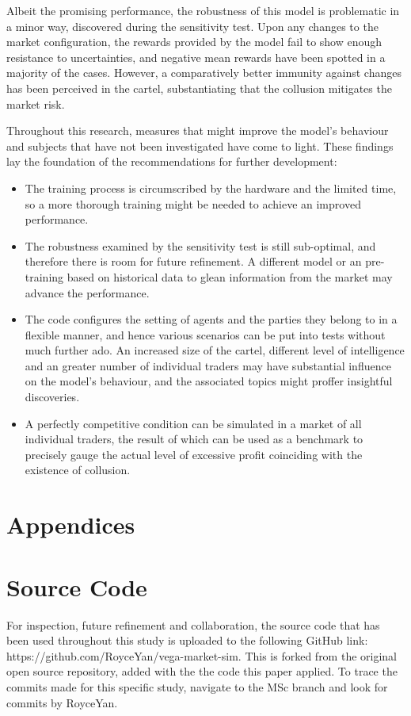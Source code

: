 \documentclass[11pt,twoside]{article}
\numberwithin{Theorem}{section}
\numberwithin{Definition}{section}
\numberwithin{Lemma}{section}
\numberwithin{Algorithm}{section}
\numberwithin{equation}{section}
\begin{document}
Albeit the promising performance, the robustness of this model is problematic in a minor way, discovered during the sensitivity test. Upon any changes to the market configuration, the rewards provided by the model fail to show enough resistance to uncertainties, and negative mean rewards have been spotted in a majority of the cases. However, a comparatively better immunity against changes has been perceived in the cartel, substantiating that the collusion mitigates the market risk.

Throughout this research, measures that might improve the model's behaviour and subjects that have not been investigated have come to light. These findings lay the foundation of the recommendations for further development:
\begin{itemize}
    \item The training process is circumscribed by the hardware and the limited time, so a more thorough training might be needed to achieve an improved performance.
    \item The robustness examined by the sensitivity test is still sub-optimal, and therefore there is room for future refinement. A different model or an pre-training based on historical data to glean information from the market may advance the performance.
    \item The code configures the setting of agents and the parties they belong to in a flexible manner, and hence various scenarios can be put into tests without much further ado. An increased size of the cartel, different level of intelligence and an greater number of individual traders may have substantial influence on the model's behaviour, and the associated topics might proffer insightful discoveries.
    \item A perfectly competitive condition can be simulated in a market of all individual traders, the result of which can be used as a benchmark to precisely gauge the actual level of excessive profit coinciding with the existence of collusion.
\end{itemize}



\clearpage


\clearpage

\appendix
\section*{Appendices}

\section{Source Code}
For inspection, future refinement and collaboration, the source code that has been used throughout this study is uploaded to the following GitHub link: https://github.com/RoyceYan/vega-market-sim. This is forked from the original open source repository, added with the the code this paper applied. To trace the commits made for this specific study, navigate to the MSc branch and look for commits by RoyceYan.
\clearpage
\end{document}
